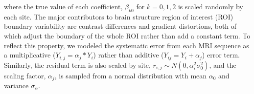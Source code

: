 where the true value of each coefficient,
$\beta_{k0}$ for  $k=0,1,2$ is scaled randomly by each site. The major contributors to brain structure region of interest (ROI) boundary variability are contrast differences and gradient distortions, both of which adjust the boundary of the whole ROI rather than add a constant term. To reflect this property, we modeled the systematic error from each MRI sequence as a multiplicative ($Y_{i,j} = \alpha_j*Y_i$) rather than additive ($Y_{ij} = Y_i + \alpha_j$) error term. Similarly, the residual term is also scaled by site, $r_{i,j} \sim N(0,\alpha_i^2\sigma_0^2)$, and the scaling factor, $\alpha_j$, is sampled from a normal distribution with mean $\alpha_0$ and variance $\sigma_{\alpha}$.